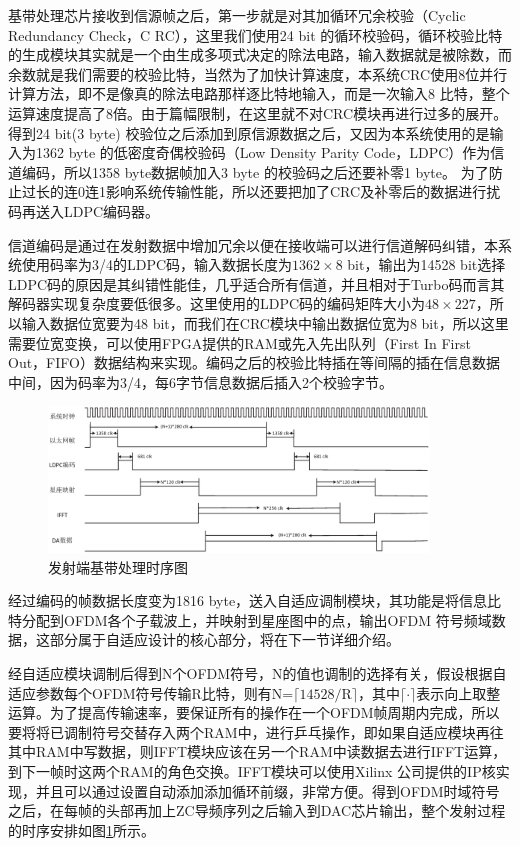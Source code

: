 基带处理芯片接收到信源帧之后，第一步就是对其加循环冗余校验（Cyclic Redundancy Check，C RC），这里我们使用24 bit 的循环校验码，循环校验比特的生成模块其实就是一个由生成多项式决定的除法电路，输入数据就是被除数，而余数就是我们需要的校验比特，当然为了加快计算速度，本系统CRC使用8位并行计算方法，即不是像真的除法电路那样逐比特地输入，而是一次输入8 比特，整个运算速度提高了8倍。由于篇幅限制，在这里就不对CRC模块再进行过多的展开。得到24 bit(3 byte) 校验位之后添加到原信源数据之后，又因为本系统使用的是输入为1362 byte 的低密度奇偶校验码（Low Density Parity Code，LDPC）作为信道编码，所以1358 byte数据帧加入3 byte 的校验码之后还要补零1 byte。 为了防止过长的连0连1影响系统传输性能，所以还要把加了CRC及补零后的数据进行扰码再送入LDPC编码器。

信道编码是通过在发射数据中增加冗余以便在接收端可以进行信道解码纠错，本系统使用码率为3/4的LDPC码，输入数据长度为$1362\times 8$ bit，输出为14528 bit选择LDPC码的原因是其纠错性能佳，几乎适合所有信道，并且相对于Turbo码而言其解码器实现复杂度要低很多。这里使用的LDPC码的编码矩阵大小为$48\times 227$，所以输入数据位宽要为48 bit，而我们在CRC模块中输出数据位宽为8 bit，所以这里需要位宽变换，可以使用FPGA提供的RAM或先入先出队列（First In First Out，FIFO）数据结构来实现。编码之后的校验比特插在等间隔的插在信息数据中间，因为码率为3/4，每6字节信息数据后插入2个校验字节。

\begin{figure}[htbp]
\centering
\includegraphics[width=0.9\textwidth]{figures/chapter-5/TimeSchemeTrans.eps}
\caption{发射端基带处理时序图}
\label{fig:TimeSchemeTrans}
\end{figure}
经过编码的帧数据长度变为1816 byte，送入自适应调制模块，其功能是将信息比特分配到OFDM各个子载波上，并映射到星座图中的点，输出OFDM 符号频域数据，这部分属于自适应设计的核心部分，将在下一节详细介绍。

经自适应模块调制后得到N个OFDM符号，N的值也调制的选择有关，假设根据自适应参数每个OFDM符号传输R比特，则有N=$\lceil 14528/\text{R} \rceil$，其中$\lceil \cdot \rceil$表示向上取整运算。为了提高传输速率，要保证所有的操作在一个OFDM帧周期内完成，所以要将将已调制符号交替存入两个RAM中，进行乒乓操作，即如果自适应模块再往其中RAM中写数据，则IFFT模块应该在另一个RAM中读数据去进行IFFT运算，到下一帧时这两个RAM的角色交换。IFFT模块可以使用Xilinx 公司提供的IP核实现，并且可以通过设置自动添加添加循环前缀，非常方便。得到OFDM时域符号之后，在每帧的头部再加上ZC导频序列之后输入到DAC芯片输出，整个发射过程的时序安排如图\ref{fig:TimeSchemeTrans}所示。
